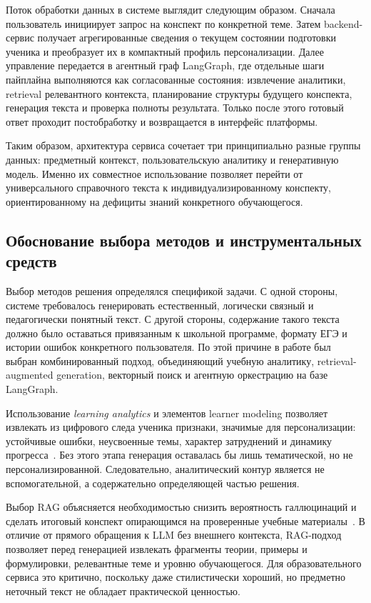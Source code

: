 \documentclass[a4paper,12pt]{extarticle}
\begin{document}
Поток обработки данных в системе выглядит следующим образом. Сначала пользователь инициирует 
запрос на конспект по конкретной теме. Затем backend-сервис получает агрегированные сведения 
о текущем состоянии подготовки ученика и преобразует их в компактный профиль персонализации. 
Далее управление передается в агентный граф LangGraph, где отдельные шаги пайплайна выполняются
как согласованные состояния: извлечение аналитики, retrieval релевантного контекста, планирование
структуры будущего конспекта, генерация текста и проверка полноты результата. Только после этого
готовый ответ проходит постобработку и возвращается в интерфейс платформы.

Таким образом, архитектура сервиса сочетает три принципиально разные группы данных: 
предметный контекст, пользовательскую аналитику и генеративную модель. 
Именно их совместное использование позволяет перейти от универсального справочного текста к 
индивидуализированному конспекту, ориентированному на дефициты знаний конкретного обучающегося.

\subsection{Обоснование выбора методов и инструментальных средств}

Выбор методов решения определялся спецификой задачи. С одной стороны, системе требовалось 
генерировать естественный, логически связный и педагогически понятный текст. 
С другой стороны, содержание такого текста должно было оставаться привязанным к школьной 
программе, формату ЕГЭ и истории ошибок конкретного пользователя. По этой причине в работе 
был выбран комбинированный подход, объединяющий учебную аналитику, 
retrieval-augmented generation, векторный поиск и агентную оркестрацию на базе LangGraph.

Использование \textit{learning analytics} и элементов learner modeling позволяет извлекать 
из цифрового следа ученика признаки, значимые для персонализации: устойчивые ошибки, 
неусвоенные темы, характер затруднений и динамику 
прогресса~\cite{khor2024la,abdelrahman2023ktsurvey}. 
Без этого этапа генерация оставалась бы лишь тематической, но не персонализированной. 
Следовательно, аналитический контур является не вспомогательной, а содержательно 
определяющей частью решения.

Выбор RAG объясняется необходимостью снизить вероятность галлюцинаций и сделать 
итоговый конспект опирающимся на проверенные учебные 
материалы~\cite{lewis2020rag,gao2024ragsurvey,ding2025ragedu}. 
В отличие от прямого обращения к LLM без внешнего контекста, 
RAG-подход позволяет перед генерацией извлекать фрагменты теории, 
примеры и формулировки, релевантные теме и уровню обучающегося. 
Для образовательного сервиса это критично, поскольку даже стилистически хороший, 
но предметно неточный текст не обладает практической ценностью.
\end{document}
